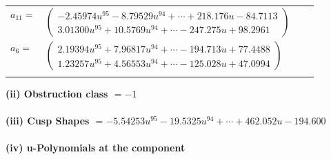 \documentclass[1p]{elsarticle_modified}
\theoremstyle{definition}
\begin{document}
\begin{tabular}{m{7pt} m{180pt} m{7pt} m{180pt} }
\flushright $a_{11}=$&$\begin{pmatrix}-2.45974 u^{95}-8.79529 u^{94}+\cdots+218.176 u-84.7113\\3.01300 u^{95}+10.5769 u^{94}+\cdots-247.275 u+98.2961\end{pmatrix}$ \\
\flushright $a_{6}=$&$\begin{pmatrix}2.19394 u^{95}+7.96817 u^{94}+\cdots-194.713 u+77.4488\\1.23257 u^{95}+4.56553 u^{94}+\cdots-125.028 u+47.0994\end{pmatrix}$\\&\end{tabular}
\flushleft \textbf{(ii) Obstruction class $= -1$}\\~\\
\flushleft \textbf{(iii) Cusp Shapes $= -5.54253 u^{95}-19.5325 u^{94}+\cdots+462.052 u-194.600$}\\~\\
\newpage\renewcommand{\arraystretch}{1}
\flushleft \textbf{(iv) u-Polynomials at the component}\newline \\
\end{document}
